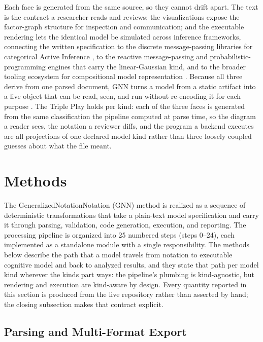 \documentclass[
  english,
  9pt,
]{extarticle}
\begin{document}
Each face is generated from the same source, so they cannot drift apart.
The text is the contract a researcher reads and reviews; the
visualizations expose the factor-graph structure for inspection and
communication; and the executable rendering lets the identical model be
simulated across inference frameworks, connecting the written
specification to the discrete message-passing libraries for categorical
Active Inference \citep{heins2022}, to the reactive message-passing and
probabilistic-programming engines that carry the linear-Gaussian kind,
and to the broader tooling ecosystem for compositional model
representation \citep{defelice2021}. Because all three derive from one
parsed document, GNN turns a model from a static artifact into a live
object that can be read, seen, and run without re-encoding it for each
purpose \citep{smith2022}. The Triple Play holds per kind: each of the
three faces is generated from the same classification the pipeline
computed at parse time, so the diagram a reader sees, the notation a
reviewer diffs, and the program a backend executes are all projections
of one declared model kind rather than three loosely coupled guesses
about what the file meant.

\newpage

\section{Methods}\label{sec:methods}

The GeneralizedNotationNotation (GNN) method is realized as a sequence
of deterministic transformations that take a plain-text model
specification and carry it through parsing, validation, code generation,
execution, and reporting. The processing pipeline is organized into 25
numbered steps (steps 0--24), each implemented as a standalone module
with a single responsibility. The methods below describe the path that a
model travels from notation to executable cognitive model and back to
analyzed results, and they state that path per model kind wherever the
kinds part ways: the pipeline's plumbing is kind-agnostic, but rendering
and execution are kind-aware by design. Every quantity reported in this
section is produced from the live repository rather than asserted by
hand; the closing subsection makes that contract explicit.

\subsection{Parsing and Multi-Format
Export}\label{parsing-and-multi-format-export}
\end{document}
